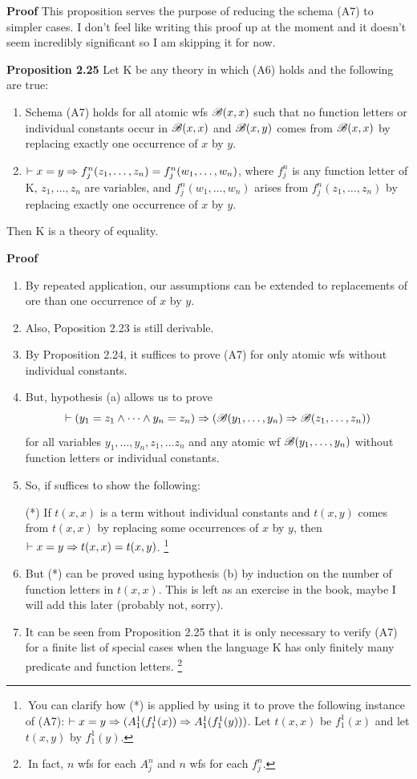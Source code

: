 \textbf{Proof}
This proposition serves the purpose of reducing the schema (A7) to simpler cases. I don't feel like writing this proof up at the moment and it doesn't seem incredibly significant so I am skipping it for now.

\textbf{Proposition 2.25}
Let K be any theory in which (A6) holds and the following are true:
\begin{enumerate} [label = \alph*.]
    \item Schema (A7) holds for all atomic wfs $\mathscr{B}(x,x)$ such that no function letters or individual constants occur in $\mathscr{B}(x,x)$ and $\mathscr{B}(x,y)$ comes from $\mathscr{B}(x,x)$ by replacing exactly one occurrence of $x$ by $y$.
    \item $\vdash x=y \Rightarrow f_j^n(z_1,\dots,z_n)=f_j^n(w_1,\dots,w_n)$, where $f_j^n$ is any function letter of K, $z_1,\dots, z_n$ are variables, and $f_j^n(w_1,\dots,w_n)$ arises from $f_j^n(z_1,\dots,z_n)$ by replacing exactly one occurrence of $x$ by $y$.
\end{enumerate}
Then K is a theory of equality. 

\textbf{Proof}
\begin{enumerate}
    \item By repeated application, our assumptions can be extended to replacements of ore than one occurrence of $x$ by $y$.
    \item Also, Poposition 2.23 is still derivable.
    \item By Proposition 2.24, it suffices to prove (A7) for only atomic wfs without individual constants.
    \item But, hypothesis (a) allows us to prove 
    \[
    \vdash (y_1=z_1 \land \dots \land y_n=z_n) \Rightarrow (\mathscr{B}(y_1, \dots, y_n) \Rightarrow \mathscr{B}(z_1, \dots, z_n))
    \]
    for all variables $y_1, \dots, y_n, z_1, \dots z_n$ and any atomic wf $\mathscr{B}(y_1, \dots, y_n)$ without function letters or individual constants.
    \item So, if suffices to show the following:
    \begin{center}
        (*) If $t(x,x)$ is a term without individual constants and $t(x,y)$ comes from $t(x,x)$ by replacing some occurrences of $x$ by $y$, then $\vdash x=y \Rightarrow t(x,x)=t(x,y)$. \footnote{$\ $You can clarify how (*) is applied by using it to prove the following instance of (A7): $\vdash x=y \Rightarrow (A_1^1(f_1^1(x))\Rightarrow A_1^1(f_1^1(y)))$. Let $t(x,x)$ be $f_1^1(x)$ and let $t(x,y)$ by $f_1^1(y)$.}
    \end{center}
    \item But (*) can be proved using hypothesis (b) by induction on the number of function letters in $t(x,x)$. This is left as an exercise in the book, maybe I will add this later (probably not, sorry).
    \item It can be seen from Proposition 2.25 that it is only necessary to verify (A7) for a finite list of special cases when the language K has only finitely many predicate and function letters. \footnote{$\ $In fact, $n$ wfs for each $A_j^n$ and $n$ wfs for each $f_j^n$.}
\end{enumerate}

